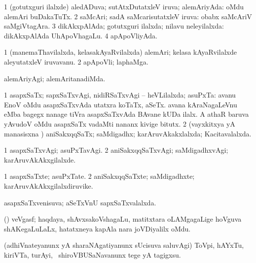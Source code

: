 \bentry
{} 
\gl{\gu}
\expl{}
\bmng
\bnum
\num{1} (gotutxguri ilalxde) aledADuva; sutAtxDutatxleV iruva; alemAriyAda:  oMdu alemAri buDakaTuTx. 
\num{2} saMcAri; sadA saMcarisutatxleV iruva:  obabx saMcAriV saMgiVtagAra. 
\num{3} dikAkxpAlAda; gotutxguri ilalxda; nilavu neleyilalxda:  dikAkxpAlAda UhApoVhagaLu. 
\num{4} apApoVliyAda. 
\enum
\emng
\eentry

\bentry
{} 
\gl{\nA}
\expl{}
\bmng
\bnum
\num{1} (manemaThavilalxda, kelasakAyaRvilalxda) alemAri; kelasa kAyaRvilalxde aleyutatxleV iruvavanu. 
\num{2} apApoVli; laphaMga. 
\enum
\emng
\eentry

\bentry
{} 
\gl{\kirxvi}
\expl{}
\bmng
 alemAriyAgi; alemAritanadiMda. 
\emng
\eentry

\bentry
{} 
\gl{\gu}
\expl{}
\bmng
\bnum
\num{1} asapxSaTx; sapxSaTxvAgi, nidiRSaTxvAgi -- heVLilalxda; asuPxTa:  avanu EnoV oMdu asapxSaTxvAda utatxra koTaTx, aSeTx.  avana kAraNagaLeVnu eMba bagegx nanage tiVra asapxSaTxvAda BAvane kUDa ilalx.  A athaR baruva yAvudoV oMdu asapxSaTx vadaMti nananx kivige bitutx. 
\num{2} (vayxkitxya yA manasisxna \vi) aniSakxqqSaTx; saMdigadhx; karAruvAkakxlalxda; Kacitavalalxda. 
\enum
\emng
\eentry

\bentry
{} 
\gl{\kirxvi}
\expl{}
\bmng
\bnum
\num{1} asapxSaTxvAgi; asuPxTavAgi. 
\num{2} aniSakxqqSaTxvAgi; saMdigadhxvAgi; karAruvAkAkxgilalxde. 
\enum
\emng
\eentry

\bentry
{} 
\gl{\nA}
\expl{}
\bmng
\bnum
\num{1} asapxSaTxte; asuPxTate. 
\num{2} aniSakxqqSaTxte; saMdigadhxte; karAruvAkAkxgilalxdiruvike. 
\enum
\emng
\eentry

\bentry
{} 
\gl{\gu}
\expl{}
\bmng
 asapxSaTxvenisuva; aSeTxVnU sapxSaTxvalalxda. 
\emng
\eentry

\bentry
{} 
\gl{\nA}
\bmng
 (\aMrashA) veVgasf; haqdaya, shAvxsakoVshagaLu, matitxtara oLAMgagaLige hoVguva shAKegaLuLaLx, hatatxneya kapAla nara joVDiyalilx oMdu. 
\emng
\eentry

\bentry
{} 
\gl{\sakirx}
\expl{}
\bmng
 (adhiVnateyanunx yA sharaNAgatiyanunx sUcisuva saluvAgi) ToVpi, hAYxTu, kiriVTa, turAyi, \mo\ shiroVBUSaNavanunx tege yA tagigxsu. 
\emng

